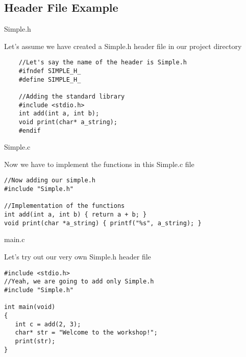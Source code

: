 \documentclass[newPxFont]{beamer}
\begin{document}
\subsection{Header File Example}

\begingroup
{}
\begin{frame}[containsverbatim]{Simple.h}

Let's assume we have created a \alert{Simple.h} header file in our project directory

\begin{verbatim}
    //Let's say the name of the header is Simple.h
    #ifndef SIMPLE_H_
    #define SIMPLE_H_
    
    //Adding the standard library
    #include <stdio.h>
    int add(int a, int b);
    void print(char* a_string);
    #endif
\end{verbatim}

\end{frame}
\endgroup

\begingroup
{}
\begin{frame}[containsverbatim]{Simple.c}

Now we have to implement the functions in this \alert{Simple.c} file


\begin{verbatim}
//Now adding our simple.h
#include "Simple.h"
    
//Implementation of the functions
int add(int a, int b) { return a + b; }
void print(char *a_string) { printf("%s", a_string); }

\end{verbatim}

\end{frame}
\endgroup

\begingroup
{}
\begin{frame}[containsverbatim]{main.c}

Let's try out our very own \alert{Simple.h} header file

\begin{verbatim}
#include <stdio.h>
//Yeah, we are going to add only Simple.h
#include "Simple.h"

int main(void)
{
   int c = add(2, 3);
   char* str = "Welcome to the workshop!";
   print(str);
}
\end{verbatim}

\end{frame}
\endgroup
\end{document}
